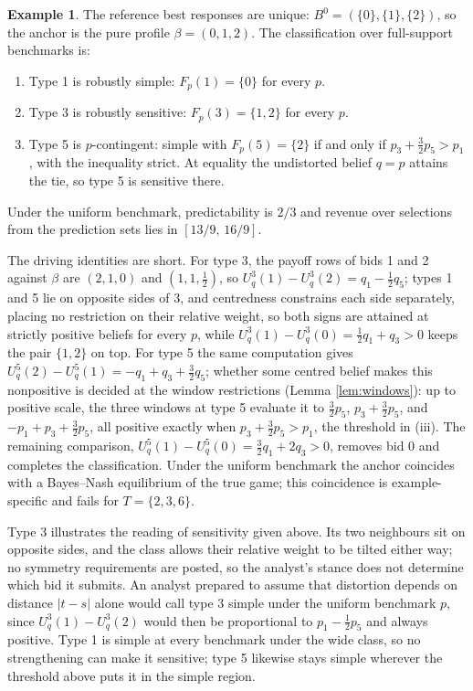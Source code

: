 \documentclass[12pt]{article}
\theoremstyle{definition}
\newtheorem{example}{Example}
\begin{document}
\begin{example}\label{ex:fpa}
The reference best responses are unique: $B^0 = (\{0\}, \{1\}, \{2\})$, so the anchor is the pure profile $\beta = (0, 1, 2)$. The classification over full-support benchmarks is:
\begin{enumerate}
\item[i.] Type 1 is robustly simple: $F_p(1) = \{0\}$ for every $p$.
\item[ii.] Type 3 is robustly sensitive: $F_p(3) = \{1, 2\}$ for every $p$.
\item[iii.] Type 5 is $p$-contingent: simple with $F_p(5) = \{2\}$ if and only if $p_3 + \tfrac{3}{2} p_5 > p_1$, with the inequality strict. At equality the undistorted belief $q = p$ attains the tie, so type 5 is sensitive there.
\end{enumerate}
Under the uniform benchmark, predictability is $2/3$ and revenue over selections from the prediction sets lies in $[13/9,\, 16/9]$. 
\end{example}

The driving identities are short. For type 3, the payoff rows of bids 1 and 2 against $\beta$ are $(2, 1, 0)$ and $(1, 1, \tfrac12)$, so $U^3_q(1) - U^3_q(2) = q_1 - \tfrac12 q_5$; types 1 and 5 lie on opposite sides of 3, and centredness constrains each side separately, placing no restriction on their relative weight, so both signs are attained at strictly positive beliefs for every $p$, while $U^3_q(1) - U^3_q(0) = \tfrac12 q_1 + q_3 > 0$ keeps the pair $\{1,2\}$ on top. For type 5 the same computation gives $U^5_q(2) - U^5_q(1) = -q_1 + q_3 + \tfrac32 q_5$; whether some centred belief makes this nonpositive is decided at the window restrictions (Lemma \ref{lem:windows}): up to positive scale, the three windows at type 5 evaluate it to $\tfrac32 p_5$, $p_3 + \tfrac32 p_5$, and $-p_1 + p_3 + \tfrac32 p_5$, all positive exactly when $p_3 + \tfrac32 p_5 > p_1$, the threshold in (iii). The remaining comparison, $U^5_q(1) - U^5_q(0) = \tfrac32 q_1 + 2 q_3 > 0$, removes bid 0 and completes the classification. Under the uniform benchmark the anchor coincides with a Bayes--Nash equilibrium of the true game; this coincidence is example-specific and fails for $T = \{2, 3, 6\}$.

Type 3 illustrates the reading of sensitivity given above. Its two neighbours sit on opposite sides, and the class allows their relative weight to be tilted either way; no symmetry requirements are posted, so the analyst's stance does not determine which bid it submits. An analyst prepared to assume that distortion depends on distance $|t-s|$ alone would call type 3 simple under the uniform benchmark $p$, since $U^3_q(1) - U^3_q(2)$ would then be proportional to $p_1 - \tfrac12 p_5$ and always positive. Type 1 is simple at every benchmark under the wide class, so no strengthening can make it sensitive; type 5 likewise stays simple wherever the threshold above puts it in the simple region.
\end{document}
